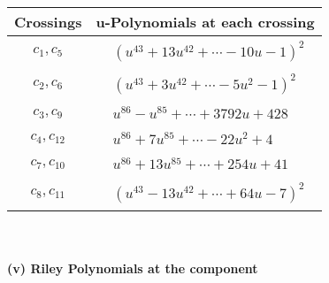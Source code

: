 \documentclass[1p]{elsarticle_modified}
\theoremstyle{definition}
\begin{document}
\begin{tabular}{m{50pt}|m{274pt}}
Crossings & \hspace{64pt}u-Polynomials at each crossing \\
\hline $$\begin{aligned}c_{1},c_{5}\end{aligned}$$&$\begin{aligned}
&(u^{43}+13 u^{42}+\cdots-10 u-1)^{2}
\end{aligned}$\\
\hline $$\begin{aligned}c_{2},c_{6}\end{aligned}$$&$\begin{aligned}
&(u^{43}+3 u^{42}+\cdots-5 u^2-1)^{2}
\end{aligned}$\\
\hline $$\begin{aligned}c_{3},c_{9}\end{aligned}$$&$\begin{aligned}
&u^{86}- u^{85}+\cdots+3792 u+428
\end{aligned}$\\
\hline $$\begin{aligned}c_{4},c_{12}\end{aligned}$$&$\begin{aligned}
&u^{86}+7 u^{85}+\cdots-22 u^2+4
\end{aligned}$\\
\hline $$\begin{aligned}c_{7},c_{10}\end{aligned}$$&$\begin{aligned}
&u^{86}+13 u^{85}+\cdots+254 u+41
\end{aligned}$\\
\hline $$\begin{aligned}c_{8},c_{11}\end{aligned}$$&$\begin{aligned}
&(u^{43}-13 u^{42}+\cdots+64 u-7)^{2}
\end{aligned}$\\
\hline
\end{tabular}\\~\\
\newpage\renewcommand{\arraystretch}{1}
\flushleft \textbf{(v) Riley Polynomials at the component}\newline \\
\end{document}
